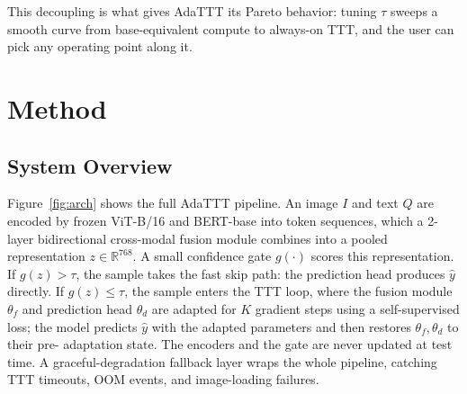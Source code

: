 \documentclass[conference]{IEEEtran}
\begin{document}
This decoupling is what gives AdaTTT its Pareto behavior: tuning $\tau$
sweeps a smooth curve from base-equivalent compute to always-on TTT,
and the user can pick any operating point along it.

\section{Method}

\subsection{System Overview}

Figure~\ref{fig:arch} shows the full AdaTTT pipeline. An image $I$ and
text $Q$ are encoded by frozen ViT-B/16 and BERT-base into token sequences,
which a 2-layer bidirectional cross-modal fusion module combines into a
pooled representation $z \in \mathbb{R}^{768}$. A small confidence gate
$g(\cdot)$ scores this representation. If $g(z) > \tau$, the sample takes
the fast skip path: the prediction head produces $\hat{y}$ directly. If
$g(z) \le \tau$, the sample enters the TTT loop, where the fusion module
$\theta_f$ and prediction head $\theta_d$ are adapted for $K$ gradient
steps using a self-supervised loss; the model predicts $\hat{y}$ with the
adapted parameters and then restores $\theta_f, \theta_d$ to their pre-
adaptation state. The encoders and the gate are never updated at test
time. A graceful-degradation fallback layer wraps the whole pipeline,
catching TTT timeouts, OOM events, and image-loading failures.
\end{document}
